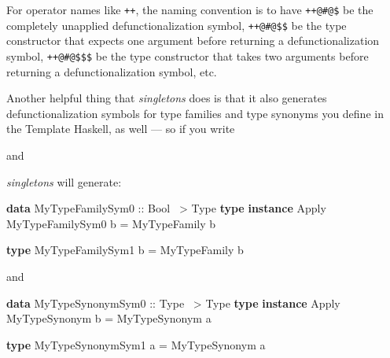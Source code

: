 \documentclass[]{article}
\newenvironment{Shaded}{}{}
\newcommand{\DataTypeTok}[1]{\textcolor[rgb]{0.56,0.13,0.00}{#1}}
\newcommand{\FunctionTok}[1]{\textcolor[rgb]{0.02,0.16,0.49}{#1}}
\newcommand{\KeywordTok}[1]{\textcolor[rgb]{0.00,0.44,0.13}{\textbf{#1}}}
\newcommand{\NormalTok}[1]{#1}
\newcommand{\OtherTok}[1]{\textcolor[rgb]{0.00,0.44,0.13}{#1}}
\begin{document}
For operator names like \texttt{++}, the naming convention is to have
\texttt{++@\#@\$} be the completely unapplied defunctionalization symbol,
\texttt{++@\#@\$\$} be the type constructor that expects one argument before
returning a defunctionalization symbol, \texttt{++@\#@\$\$\$} be the type
constructor that takes two arguments before returning a defunctionalization
symbol, etc.

Another helpful thing that \emph{singletons} does is that it also generates
defunctionalization symbols for type families and type synonyms you define in
the Template Haskell, as well --- so if you write

\begin{Shaded}
\end{Shaded}

and

\begin{Shaded}
\end{Shaded}

\emph{singletons} will generate:

\begin{Shaded}
\begin{Highlighting}[]
\KeywordTok{data} \DataTypeTok{MyTypeFamilySym0}\OtherTok{ ::} \DataTypeTok{Bool} \FunctionTok{~>} \DataTypeTok{Type}
\KeywordTok{type} \KeywordTok{instance} \DataTypeTok{Apply} \DataTypeTok{MyTypeFamilySym0}\NormalTok{ b }\FunctionTok{=} \DataTypeTok{MyTypeFamily}\NormalTok{ b}

\KeywordTok{type} \DataTypeTok{MyTypeFamilySym1}\NormalTok{ b }\FunctionTok{=} \DataTypeTok{MyTypeFamily}\NormalTok{ b}
\end{Highlighting}
\end{Shaded}

and

\begin{Shaded}
\begin{Highlighting}[]
\KeywordTok{data} \DataTypeTok{MyTypeSynonymSym0}\OtherTok{ ::} \DataTypeTok{Type} \FunctionTok{~>} \DataTypeTok{Type}
\KeywordTok{type} \KeywordTok{instance} \DataTypeTok{Apply} \DataTypeTok{MyTypeSynonym}\NormalTok{ b }\FunctionTok{=} \DataTypeTok{MyTypeSynonym}\NormalTok{ a}

\KeywordTok{type} \DataTypeTok{MyTypeSynonymSym1}\NormalTok{ a }\FunctionTok{=} \DataTypeTok{MyTypeSynonym}\NormalTok{ a}
\end{Highlighting}
\end{Shaded}
\end{document}
